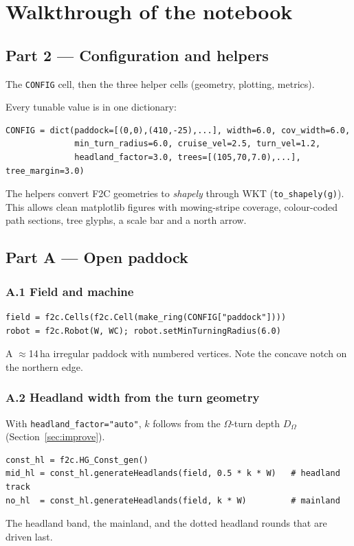 \documentclass[11pt,a4paper]{article}
\newcommand{\code}[1]{\texttt{\small #1}}
\begin{document}
\section{Walkthrough of the notebook}

\subsection*{Part 2 --- Configuration and helpers}
\begin{runbox}[Run]
The \code{CONFIG} cell, then the three helper cells (geometry, plotting, metrics).
\end{runbox}
Every tunable value is in one dictionary:
\begin{lstlisting}
CONFIG = dict(paddock=[(0,0),(410,-25),...], width=6.0, cov_width=6.0,
              min_turn_radius=6.0, cruise_vel=2.5, turn_vel=1.2,
              headland_factor=3.0, trees=[(105,70,7.0),...], tree_margin=3.0)
\end{lstlisting}
The helpers convert F2C geometries to \emph{shapely} through WKT (\code{to\_shapely(g)}). This allows clean matplotlib figures with
mowing-stripe coverage, colour-coded path sections, tree glyphs, a scale bar and a north arrow.

\subsection*{Part A --- Open paddock}

\subsubsection*{A.1 Field and machine}
\begin{lstlisting}
field = f2c.Cells(f2c.Cell(make_ring(CONFIG["paddock"])))
robot = f2c.Robot(W, WC); robot.setMinTurningRadius(6.0)
\end{lstlisting}
\begin{seebox}A $\approx$14\,ha irregular paddock with numbered vertices. Note the concave notch on the northern edge.\end{seebox}

\subsubsection*{A.2 Headland width from the turn geometry}
With \code{headland\_factor="auto"}, $k$ follows from the $\Omega$-turn depth $D_\Omega$ (Section~\ref{sec:improve}).
\begin{lstlisting}
const_hl = f2c.HG_Const_gen()
mid_hl = const_hl.generateHeadlands(field, 0.5 * k * W)   # headland track
no_hl  = const_hl.generateHeadlands(field, k * W)         # mainland
\end{lstlisting}
\begin{seebox}The headland band, the mainland, and the dotted headland rounds that are driven last.\end{seebox}
\end{document}

